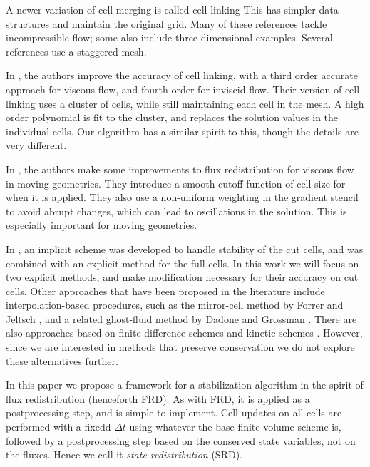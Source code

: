 A newer variation of cell merging is called cell linking \cite{cecereGiacomazzi,
KirkpatrickEtAl:2003, HuKhooAdamsHuang:2006,Chung:2006} 
This has simpler data structures and maintain the original grid. 
Many of these references tackle incompressible flow; some also include
three dimensional examples. Several references use a staggered mesh. 

In \cite{BalajiMenon:2016}, the authors improve the accuracy of cell linking,
with a third order accurate approach for viscous flow,  and fourth order for 
inviscid flow. 
Their version of cell linking uses a cluster of cells,
while still maintaining each cell in the mesh.  A high order
polynomial is fit to the cluster, and replaces the solution values in the
individual cells.  Our algorithm has a similar spirit to this, though the
details are very different. 

In \cite{shws:2011}, the authors make
some improvements to flux redistribution for viscous flow in moving
geometries. They introduce a
smooth cutoff function of cell size for when it is applied. They also
use a non-uniform weighting in the gradient stencil to avoid abrupt
changes, which can lead to oscillations in the solution. This is
especially important for moving geometries.

In \cite{May-Berger:JSC}, an implicit scheme was developed to
handle stability of the cut cells, and was combined with an 
explicit method for the full cells. In this work we will focus on 
two explicit methods, and make modification necessary for their accuracy 
on cut cells.
Other approaches that have been proposed in the literature include
interpolation-based procedures, such as the mirror-cell method by Forrer
and Jeltsch \cite{article:FoJe98}, and a related ghost-fluid method by
Dadone and Grossman \cite{DadoneGrossman}.
There are also approaches based on finite difference schemes
\cite{SjogreenPetersson,MarcoBjorn}
and kinetic schemes \cite{Oksuzoglu:thesis,KeenKarni}.
However, since we are interested in methods
that preserve conservation we do not explore these alternatives further.

In this paper we propose a framework for a stabilization algorithm in
the spirit of flux redistribution (henceforth FRD). 
As with FRD, it is applied as a postprocessing
step, and is simple to implement. Cell updates on all cells are performed
with a fixedd $\Delta t$ using whatever the base finite volume scheme is, followed by a 
postprocessing step based on the
conserved state variables, not on the fluxes.
Hence we call it {\em state redistribution} (SRD).


